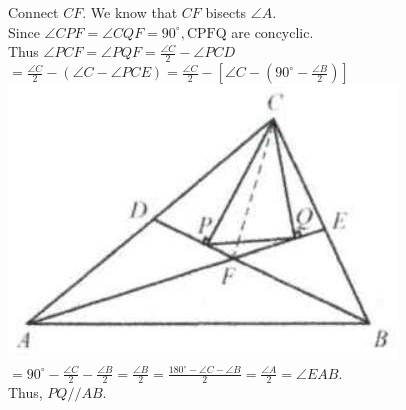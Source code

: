 \documentclass{article}
\begin{document}
Connect \(C F\). We know that \(C F\) bisects \(\angle A\).\\
Since \(\angle C P F=\angle C Q F=90^{\circ}, \mathrm{CPFQ}\) are concyclic.\\
Thus \(\angle P C F=\angle P Q F=\frac{\angle C}{2}-\angle P C D\)\\
\(=\frac{\angle C}{2}-(\angle C-\angle P C E)=\frac{\angle C}{2}-\left[\angle C-\left(90^{\circ}-\frac{\angle B}{2}\right)\right]\)\\
\centering
\includegraphics[width=\textwidth]{images/059(1).jpg}\\
\(=90^{\circ}-\frac{\angle C}{2}-\frac{\angle B}{2}=\frac{\angle B}{2}=\frac{180^{\circ}-\angle C-\angle B}{2}=\frac{\angle A}{2}=\angle E A B\).\\
Thus, \(P Q / / A B\).\\
\end{document}
